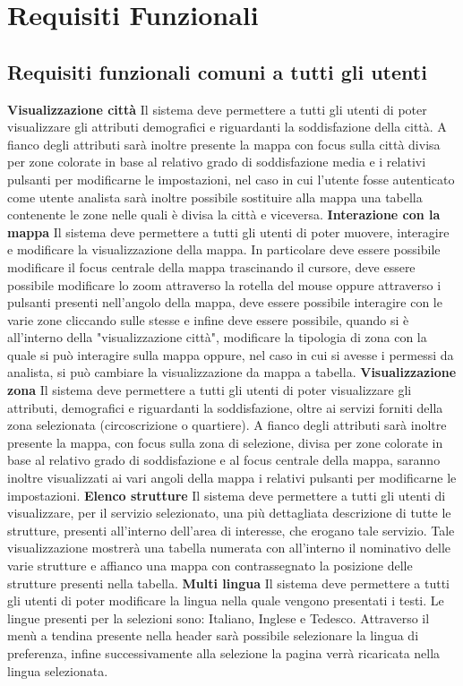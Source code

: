 \chapter{Requisiti Funzionali} 
    \section{Requisiti funzionali comuni a tutti gli utenti}
        \begin{rfList}
            \rfItem \textbf{Visualizzazione città} Il sistema deve permettere a tutti gli utenti di poter visualizzare gli attributi demografici e riguardanti la soddisfazione della città. A fianco degli attributi sarà inoltre presente la mappa con focus sulla città divisa per zone colorate in base al relativo grado di soddisfazione media e i relativi pulsanti per modificarne le impostazioni, nel caso in cui l'utente fosse autenticato come utente analista sarà inoltre possibile sostituire alla mappa una tabella contenente le zone nelle quali è divisa la città e viceversa.
            \rfItem \textbf{Interazione con la mappa} Il sistema deve permettere a tutti gli utenti di poter muovere, interagire e modificare la visualizzazione della mappa. In particolare deve essere possibile modificare il focus centrale della mappa trascinando il cursore, deve essere possibile modificare lo zoom attraverso la rotella del mouse oppure attraverso i pulsanti presenti nell'angolo della mappa, deve essere possibile interagire con le varie zone cliccando sulle stesse e infine deve essere possibile, quando si è all'interno della "visualizzazione città", modificare la tipologia di zona con la quale si può interagire sulla mappa oppure, nel caso in cui si avesse i permessi da analista, si può cambiare la visualizzazione da mappa a tabella.
            \rfItem \textbf{Visualizzazione zona} Il sistema deve permettere a tutti gli utenti di poter visualizzare gli attributi, demografici e riguardanti la soddisfazione, oltre ai servizi forniti della zona selezionata (circoscrizione o quartiere). A fianco degli attributi sarà inoltre presente la mappa, con focus sulla zona di selezione, divisa per zone colorate in base al relativo grado di soddisfazione e al focus centrale della mappa, saranno inoltre visualizzati ai vari angoli della mappa i relativi pulsanti per modificarne le impostazioni.
            \rfItem \textbf{Elenco strutture} Il sistema deve permettere a tutti gli utenti di visualizzare, per il servizio selezionato, una più dettagliata descrizione di tutte le strutture, presenti all'interno dell'area di interesse, che erogano tale servizio. Tale visualizzazione mostrerà una tabella numerata con all'interno il nominativo delle varie strutture e affianco una mappa con contrassegnato la posizione delle strutture presenti nella tabella.
            \rfItem \textbf{Multi lingua} Il sistema deve permettere a tutti gli utenti di poter modificare la lingua nella quale vengono presentati i testi. Le lingue presenti per la selezioni sono: Italiano, Inglese e Tedesco. Attraverso il menù a tendina presente nella header sarà possibile selezionare la lingua di preferenza, infine successivamente alla selezione la pagina verrà ricaricata nella lingua selezionata.
        \end{rfList}

